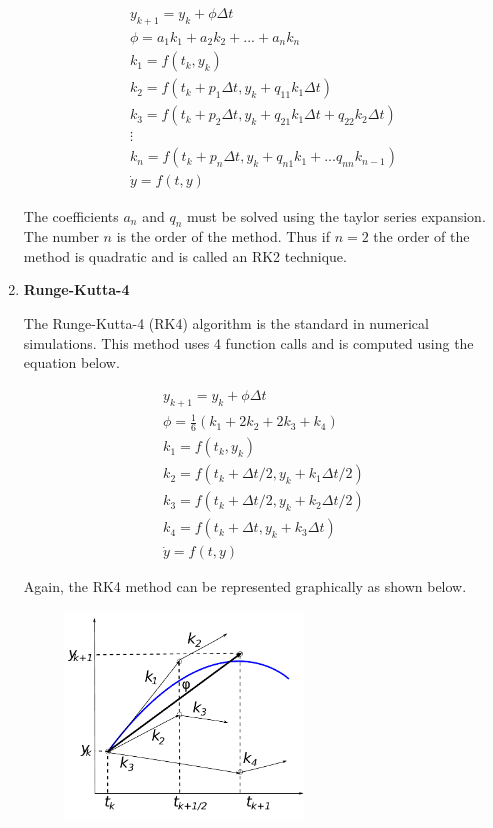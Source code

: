\begin{enumerate}
\begin{equation}
\begin{matrix}
y_{k+1} = y_k + \phi \Delta t \\
\phi = a_1 k_1 + a_2 k_2 + ... + a_n k_n \\
k_1 = f(t_k,y_k) \\
k_2 = f(t_k + p_1 \Delta t,y_k + q_{11} k_1 \Delta t) \\
k_3 = f(t_k + p_2 \Delta t,y_k + q_{21}k_1 \Delta t +
q_{22}k_2\Delta t) \\
\vdots \\
k_n = f(t_k + p_n \Delta t,y_k + q_{n1}k_1 + ... q_{nn}k_{n-1}) \\
\dot{y} = f(t,y)
\end{matrix}
\end{equation}

The coefficients $a_n$ and $q_n$ must be solved using the taylor
series expansion. The number $n$ is the order of the method. Thus if
$n=2$ the order of the method is quadratic and is called an RK2
technique.

\item {\bf Runge-Kutta-4}

The Runge-Kutta-4 (RK4) algorithm is the standard in numerical
simulations. This method uses 4 function calls and is computed using
the equation below.

\begin{equation}
\begin{matrix}
y_{k+1} = y_k + \phi \Delta t \\
\phi = \frac{1} 6(k_1 + 2 k_2 + 2 k_3 + k_4) \\
k_1 = f(t_k,y_k) \\
k_2 = f(t_k + \Delta t/2,y_k + k_1 \Delta t/2) \\
k_3 = f(t_k + \Delta t/2,y_k + k_2 \Delta t/2) \\
k_4 = f(t_k + \Delta t,y_k + k_3 \Delta t) \\
\dot{y} = f(t,y)
\end{matrix}
\end{equation}

Again, the RK4 method can be represented graphically as shown below.

\begin{figure}[H]
  \begin{center}
    \includegraphics[height=0.55\textwidth,width=0.6\textwidth]{Graphics/RK4.pdf}
  \end{center}
\end{figure}


\end{enumerate}
